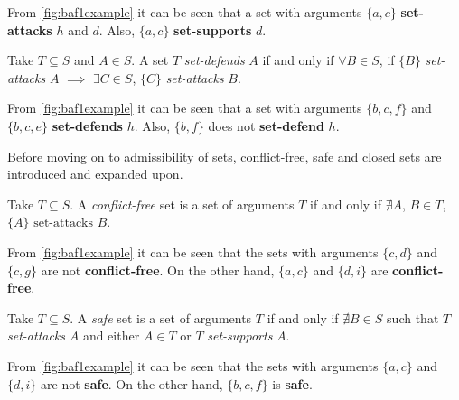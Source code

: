             \begin{exa}
                From \autoref{fig:baf1example} it can be seen that a set with arguments $\{a, c\}$ \textbf{set-attacks} $h$ and $d$. Also, $\{a, c\}$ \textbf{set-supports} $d$.
                \label{exa:example12}
            \end{exa}
            
            \begin{definition}
                Take $T \subseteq S$ and $A \in S$. A set $T$ \textit{set-defends} $A$ if and only if $\forall B \in S$, if $\{B\}$ \textit{set-attacks} $A$ $\implies$ $\exists C \in S$, $\{C\}$ \textit{set-attacks} $B$.
                \label{definition:definition15}
            \end{definition}
            
            \begin{exa}
                From \autoref{fig:baf1example} it can be seen that a set with arguments $\{b, c, f\}$ and $\{b, c, e\}$ \textbf{set-defends} $h$. Also, $\{b, f\}$ does not \textbf{set-defend} $h$.
                \label{exa:example13}
            \end{exa}
            
            Before moving on to admissibility of sets, conflict-free, safe and closed sets are introduced and expanded upon.
            
            \begin{definition}
                Take $T \subseteq S$. A \textit{conflict-free} set is a set of arguments $T$ if and only if $\nexists A$, $B \in T$, $\{A\} \text{ set-attacks } B$.
                \label{definition:definition16}
            \end{definition}
            \begin{exa}
                From \autoref{fig:baf1example} it can be seen that the sets with arguments $\{c, d\}$ and $\{c, g\}$ are not \textbf{conflict-free}. On the other hand, $\{a, c\}$ and $\{d, i\}$ are \textbf{conflict-free}.
                \label{exa:example14}
            \end{exa}
            
            \begin{definition}
                Take $T \subseteq S$. A \textit{safe} set is a set of arguments $T$ if and only if $\nexists B \in S$ such that $T$ \textit{set-attacks} $A$ and either $A \in T$ or $T$ \textit{set-supports} $A$.
                \label{definition:definition17}
            \end{definition}
            \begin{exa}
                From \autoref{fig:baf1example} it can be seen that the sets with arguments $\{a, c\}$ and $\{d, i\}$ are not \textbf{safe}. On the other hand, $\{b, c, f\}$ is \textbf{safe}.
                \label{exa:example15}
            \end{exa}
            
